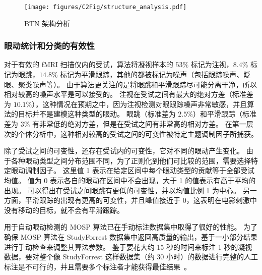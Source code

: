 \begin{figure}
	\centering
	\texttt{[image: figures/C2Fig/structure\_analysis.pdf]}
	\caption{
		BTN 架构分析
	}
	\label{fig:structure_analysis}
\end{figure}

\subsubsection{眼动统计和分类的有效性}
对于有效的 fMRI 扫描仪内的受试，算法将凝视样本的 $53\%$ 标记为注视，$8.4\%$ 标记为眼跳，$14.8\%$ 标记为平滑跟踪，其他的都被标记为噪声（包括跟踪噪声、眨眼、聚类噪声等）。
由于算法更关注的是将眼跳和平滑跟踪尽可能分离干净，所以相对较高的噪声水平是可以接受的。
注视在受试之间有最大的绝对方差（标准差为 $10.1\%$），这种情况在预期之中，因为注视检测对眼跟踪噪声非常敏感，并且算法的目标并不是建模这种类型的眼动。
眼跳（标准差为 $2.5\%$）和平滑跟踪（标准差为 $3\%$ 有非常低的绝对方差，但是在受试之间有非常高的相对方差。
在第一层次的个体分析中，这种相对较高的受试之间的可变性被特定主题调制因子所捕获。

除了受试之间的可变性，还存在受试内的可变性，它对不同的眼动产生变化。
由于各种眼动类型之间分布范围不同，为了正则化到他们可比较的范围，需要选择特定眼动调制因子。
这里值 1 表示在给定区间中每个眼动类型的贡献等于全部受试均值。
值为 0 表示各自的眼动在区间中不会出现，大于 1 的值表示有高于平均的出现。
可以得出在受试之间眼跳有更低的可变性，并以均值比例 1 为中心。
另一方面，平滑跟踪的出现有更高的可变性，并且峰值接近于 0，这表明在电影刺激中没有移动的目标，就不会有平滑跟踪。

用于自动眼动检测的 MOSP 算法已在手动标注数据集中取得了很好的性能\cite{mosp}。 
为了确保 MOSP 算法在 StudyForrest 数据集中返回高质量的输出，基于一小部分结果进行手动检查来调整其算法参数。 
鉴于要花大约 15 秒的时间来标注 1 秒的凝视数据，要对整个像 StudyForrest 这样数据集（约 30 小时）的数据进行完整的人工标注是不可行的，并且需要多个标注者才能获得最佳结果~\cite{startsev2019characterizing}。










